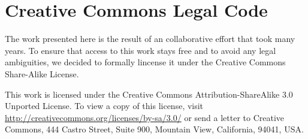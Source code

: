 \section{Creative Commons Legal Code}
\label{sec:cc}        

The work presented here is the result of an collaborative effort
that took many years.  To ensure that access to this work stays free
and to avoid any legal ambiguities, we decided to formally lincense
it under the Creative Commons Share-Alike License.

This work is licensed under the Creative Commons Attribution-ShareAlike 3.0 Unported License. To view a copy of this license, visit \url{http://creativecommons.org/licenses/by-sa/3.0/} or send a letter to Creative Commons, 444 Castro Street, Suite 900, Mountain View, California, 94041, USA.

